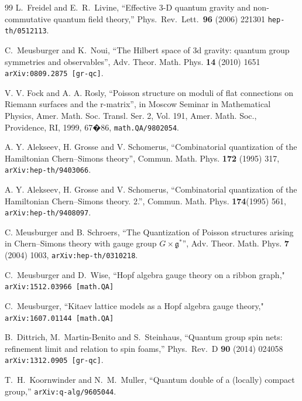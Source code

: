 \documentclass[nofootinbib,superscriptaddress,eqsecnum,tightenlines,11pt]{revtex4-1}
\begin{document}
\begin{thebibliography}{99}
   L.~Freidel and E.~R.~Livine,
  ``Effective 3-D quantum gravity and non-commutative quantum field theory,''
  Phys.\ Rev.\ Lett.\  {\bf 96} (2006) 221301
  \texttt{hep-th/0512113}.
 
 
 C.~Meusburger and K.~Noui,
``The Hilbert space of 3d gravity: quantum group symmetries and observables'',
Adv. Theor. Math. Phys. {\bf14} (2010) 1651 \texttt{arXiv:0809.2875 [gr-qc]}.

V. V. Fock and A. A. Rosly,
``Poisson structure on moduli of flat connections on Riemann surfaces and the r-matrix'',
in Moscow Seminar in Mathematical Physics, Amer. Math. Soc. Transl. Ser. 2, Vol. 191, Amer. Math. Soc., Providence, RI, 1999, 67�86, \texttt{math.QA/9802054}.

 A. Y. Alekseev, H. Grosse and V. Schomerus,
``Combinatorial quantization of the Hamiltonian Chern--Simons theory'',
Commun. Math. Phys. \textbf{172} (1995) 317, \texttt{arXiv:hep-th/9403066}.

 A. Y. Alekseev, H. Grosse and V. Schomerus,
``Combinatorial quantization of the Hamiltonian Chern--Simons theory. 2.'',
Commun. Math. Phys. \textbf{174}(1995) 561, \texttt{arXiv:hep-th/9408097}.



 C. Meusburger and B. Schroers,
``The Quantization of Poisson structures arising in Chern--Simons theory with gauge group $G\times\mathfrak{g}^*$'',
Adv. Theor. Math. Phys. \textbf{7} (2004) 1003, \texttt{arXiv:hep-th/0310218}.


C.~Meusburger and D.~Wise,
``Hopf algebra gauge theory on a ribbon graph,"
\texttt{arXiv:1512.03966 [math.QA]}

C.~Meusburger, 
``Kitaev lattice models as a Hopf algebra gauge theory," \texttt{arXiv:1607.01144 [math.QA]}
 
 
  B.~Dittrich, M.~Martin-Benito and S.~Steinhaus,
  ``Quantum group spin nets: refinement limit and relation to spin foams,''
  Phys.\ Rev.\ D {\bf 90} (2014) 024058
  \texttt{arXiv:1312.0905 [gr-qc]}.
  
 T.~H.~Koornwinder and N.~M.~Muller,
  ``Quantum double of a (locally) compact group,''
  \texttt{arXiv:q-alg/9605044}.
  

\end{thebibliography}
\end{document}
